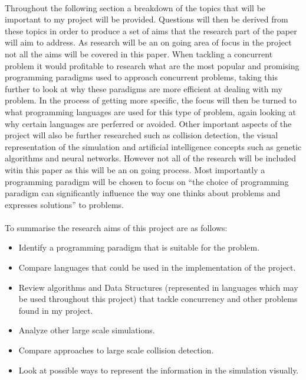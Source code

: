 \documentclass{report}
\begin{document}
\paragraph{}Throughout the following section a breakdown of the topics that will be important to my project will be provided. Questions will then be derived from these topics in order to produce a set of aims that the research part of the paper will aim to address. As research will be an on going area of focus in the project not all the aims will be covered in this paper. When tackling a concurrent problem it would profitable to research what are the most popular and promising programming paradigms used to approach concurrent problems, taking this further to look at why these paradigms are more efficient at dealing with my problem. In the process of getting more specific, the focus will then be turned to what programming languages are used for this type of problem, again looking at why certain languages are perferred or avoided. Other important aspects of the project will also be further researched such as collision detection, the visual representation of the simulation and artificial intelligence concepts such as genetic algorithms and neural networks. However not all of the research will be included witin this paper as this will be an on going process. Most importantly a programming paradigm will be chosen to focus on ``the choice of programming paradigm can significantly influence the way one thinks about problems and expresses solutions'' to problems. \cite{Curriculum2008}

\paragraph{}To summarise the research aims of this project are as follows:
\begin{itemize}
	\item Identify a programming paradigm that is suitable for the problem.
	\item Compare languages that could be used in the implementation of the project.
	\item Review algorithms and Data Structures (represented in languages which may be used throughout this project) that tackle concurrency and other problems found in my project.
	\item Analyze other large scale simulations.
	\item Compare approaches to large scale collision detection.
	\item Look at possible ways to represent the information in the simulation visually.
\end{itemize}
\end{document}
